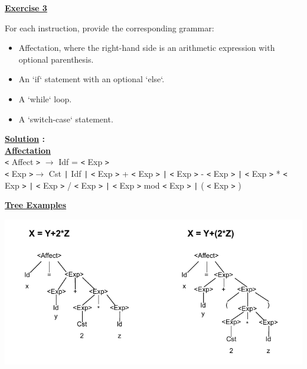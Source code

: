 \newpage

\begin{center}
    \Huge{\textbf{\underline{Exercise 3}}}
\end{center}

\vspace{0.3cm}

For each instruction, provide the corresponding grammar:  
\begin{itemize}
    \item Affectation, where the right-hand side is an arithmetic expression with
        optional parenthesis. 
    \item An `if` statement with an optional `else`.  
    \item A `while` loop.  
    \item A `switch-case` statement.  
\end{itemize}

\vspace{1cm}

\textbf{\underline{\Large{Solution}} :}\\[0.4cm]
\textbf{\underline{Affectation}}\\[0.25cm]
\texttt{<} Affect \texttt{>} \(\to\) Idf = \texttt{<} Exp \texttt{>}\\[0.1cm]
\texttt{<} Exp \texttt{>}\(\to\) Cst \texttt{|} Idf \texttt{|} 
\texttt{<} Exp \texttt{>} + \texttt{<} Exp \texttt{>}
\texttt{|} \texttt{<} Exp \texttt{>} - \texttt{<} Exp \texttt{>}
\texttt{|} \texttt{<} Exp \texttt{>} * \texttt{<} Exp \texttt{>}
\texttt{|} \texttt{<} Exp \texttt{>} / \texttt{<} Exp \texttt{>}
\texttt{|} \texttt{<} Exp \texttt{>} mod \texttt{<} Exp \texttt{>}
\texttt{|} ( \texttt{<} Exp \texttt{>} )

\vspace{1cm}

\textbf{\underline{Tree Examples}}

\begin{center} 
    \includegraphics[height=0.5\textheight]{Exercices/EX3/tree3.1.drawio.pdf}
\end{center}

